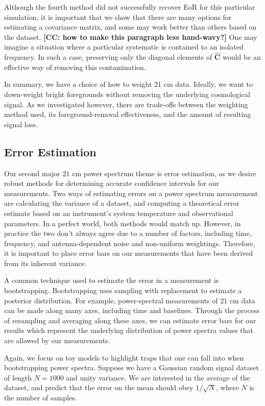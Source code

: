 \documentclass[preprint2,numberedappendix,tighten]{aastex6}  %
\newcommand{\cc}[1]{{\color{purple} \textbf{[CC: #1]}}}
\begin{document}
Although the fourth method did not successfully recover EoR for this particular simulation, it is important that we show that there are many options for estimating a covariance matrix, and some may work better than others based on the dataset. \cc{how to make this paragraph less hand-wavy?} One may imagine a situation where a particular systematic is contained to an isolated frequency. In such a case, preserving only the diagonal elements of $\hat{\textbf{C}}$ would be an effective way of removing this contamination. 

In summary, we have a choice of how to weight $21$ cm data. Ideally, we want to down-weight bright foregrounds without removing the underlying cosmological signal. As we investigated however, there are trade-offs between the weighting method used, its foreground-removal effectiveness, and the amount of resulting signal loss. 

\subsection{Error Estimation}
\label{sec:ErrorOverview}

Our second major $21$ cm power spectrum theme is error estimation, as we desire robust methods for determining accurate confidence intervals for our measurements. Two ways of estimating errors on a power spectrum measurement are calculating the variance of a dataset, and computing a theoretical error estimate based on an instrument's system temperature and observational parameters. In a perfect world, both methods would match up. However, in practice the two don't always agree due to a number of factors, including time, frequency, and antenna-dependent noise and non-uniform weightings. Therefore, it is important to place error bars on our measurements that have been derived from its inherent variance.

A common technique used to estimate the error in a measurement is bootstrapping. Bootstrapping uses sampling with replacement to estimate a posterior distribution. For example, power-spectral measurements of $21$ cm data can be made along many axes, including time and baselines. Through the process of resampling and averaging along these axes, we can estimate error bars for our results which represent the underlying distribution of power spectra values that are allowed by our measurements.

Again, we focus on toy models to highlight traps that one can fall into when bootstrapping power spectra. Suppose we have a Gaussian random signal dataset of length $N=1000$ and unity variance. We are interested in the average of the dataset, and predict that the error on the mean should obey $1/\sqrt{N}$, where $N$ is the number of samples.
\end{document}
